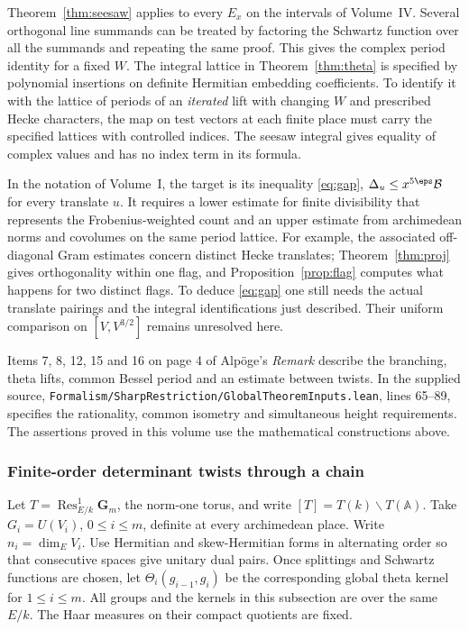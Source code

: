 \documentclass[a4paper,11pt]{article}
\theoremstyle{definition}
\theoremstyle{remark}
\newcommand{\lead}[1]{\par\smallskip\noindent{\bfseries\color{ink}#1.}\enspace}
\numberwithin{equation}{section}
\begin{document}
Theorem~\ref{thm:seesaw} applies to every \(E_x\) on the intervals of Volume~IV. Several orthogonal line summands can be treated by factoring the Schwartz function over all the summands and repeating the same proof. This gives the complex period identity for a fixed \(W\). The integral lattice in Theorem~\ref{thm:theta} is specified by polynomial insertions on definite Hermitian embedding coefficients. To identify it with the lattice of periods of an \emph{iterated} lift with changing \(W\) and prescribed Hecke characters, the map on test vectors at each finite place must carry the specified lattices with controlled indices. The seesaw integral gives equality of complex values and has no index term in its formula.

In the notation of Volume~I, the target is its inequality \eqref{eq:gap}, \(\Delta_u\le x^{5\eps}\mathcal B\) for every translate \(u\). It requires a lower estimate for finite divisibility that represents the Frobenius-weighted count and an upper estimate from archimedean norms and covolumes on the same period lattice. For example, the associated off-diagonal Gram estimates concern distinct Hecke translates; Theorem~\ref{thm:proj} gives orthogonality within one flag, and Proposition~\ref{prop:flag} computes what happens for two distinct flags. To deduce \eqref{eq:gap} one still needs the actual translate pairings and the integral identifications just described. Their uniform comparison on \([V,V^{3/2}]\) remains unresolved here.

\lead{Source of the comparison}Items 7, 8, 12, 15 and 16 on page 4 of Alp\"oge's \emph{Remark} describe the branching, theta lifts, common Bessel period and an estimate between twists. In the supplied source, \nolinkurl{Formalism/SharpRestriction/GlobalTheoremInputs.lean}, lines 65--89, specifies the rationality, common isometry and simultaneous height requirements. The assertions proved in this volume use the mathematical constructions above.~\cite{XIV-XI-IV-remark}

\subsubsection{Finite-order determinant twists through a chain}\label{nav:I-40}
\label{sec:chain}

Let \(T=\operatorname{Res}^{1}_{E/k}\mathbf G_m\), the norm-one torus, and write \([T]=T(k)\backslash T(\mathbb A)\). Take \(G_i=U(V_i)\), \(0\le i\le m\), definite at every archimedean place. Write \(n_i=\dim_E V_i\). Use Hermitian and skew-Hermitian forms in alternating order so that consecutive spaces give unitary dual pairs. Once splittings and Schwartz functions are chosen, let \(\Theta_i(g_{i-1},g_i)\) be the corresponding global theta kernel for \(1\le i\le m\). All groups and the kernels in this subsection are over the same \(E/k\). The Haar measures on their compact quotients are fixed.
\end{document}
